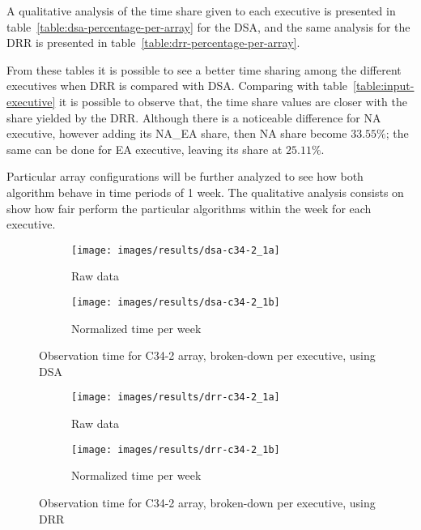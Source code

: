 A qualitative analysis of the time share given to each executive is presented in table~\ref{table:dsa-percentage-per-array} for the DSA, and the same analysis for the DRR is presented in table~\ref{table:drr-percentage-per-array}. 

From these tables it is possible to see a better time sharing among the different executives when DRR is compared with DSA. Comparing with table~\ref{table:input-executive} it is possible to observe that, the time share values are closer with the share yielded by the DRR. Although there is a noticeable difference for NA executive, however adding its NA\_EA share, then NA share become $33.55\%$; the same can be done for EA executive, leaving its share at $25.11\%$.

Particular array configurations will be further analyzed to see how both algorithm behave in time periods of 1 week. The qualitative analysis consists on show how fair perform the particular algorithms within the week for each executive.

\begin{figure}[t]
\centering
	\begin{subfigure}[b]{0.49\textwidth}
		\texttt{[image: images/results/dsa-c34-2\_1a]}
        \caption{Raw data} 
    \end{subfigure} 
    \begin{subfigure}[b]{0.49\textwidth}
    		\texttt{[image: images/results/dsa-c34-2\_1b]}
            \caption{Normalized time per week} 
    \end{subfigure}
    \caption{Observation time for C34-2 array, broken-down per executive, using DSA}
    \label{fig:dsa-c34-2-exec}
\end{figure}

\begin{figure}[t]
\centering
	\begin{subfigure}[b]{0.49\textwidth}
		\texttt{[image: images/results/drr-c34-2\_1a]}
        \caption{Raw data} 
    \end{subfigure} 
    \begin{subfigure}[b]{0.49\textwidth}
    		\texttt{[image: images/results/drr-c34-2\_1b]}
            \caption{Normalized time per week} 
    \end{subfigure}
    \caption{Observation time for C34-2 array, broken-down per executive, using DRR}
    \label{fig:drr-c34-2-exec}
\end{figure}

